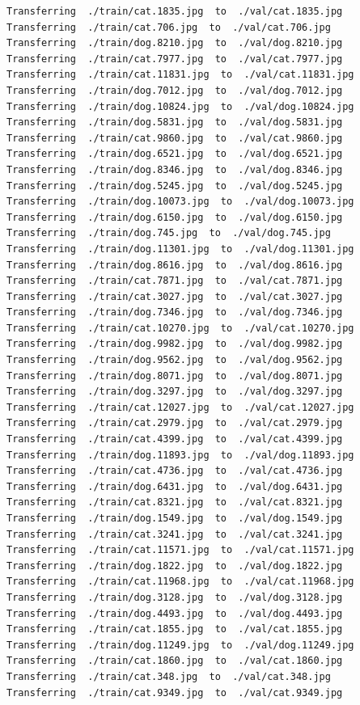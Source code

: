\documentclass[]{book}
\theoremstyle{definition}
\theoremstyle{definition}
\theoremstyle{definition}
\theoremstyle{remark}
\begin{document}
\begin{verbatim}
Transferring  ./train/cat.1835.jpg  to  ./val/cat.1835.jpg
Transferring  ./train/cat.706.jpg  to  ./val/cat.706.jpg
Transferring  ./train/dog.8210.jpg  to  ./val/dog.8210.jpg
Transferring  ./train/cat.7977.jpg  to  ./val/cat.7977.jpg
Transferring  ./train/cat.11831.jpg  to  ./val/cat.11831.jpg
Transferring  ./train/dog.7012.jpg  to  ./val/dog.7012.jpg
Transferring  ./train/dog.10824.jpg  to  ./val/dog.10824.jpg
Transferring  ./train/dog.5831.jpg  to  ./val/dog.5831.jpg
Transferring  ./train/cat.9860.jpg  to  ./val/cat.9860.jpg
Transferring  ./train/dog.6521.jpg  to  ./val/dog.6521.jpg
Transferring  ./train/dog.8346.jpg  to  ./val/dog.8346.jpg
Transferring  ./train/dog.5245.jpg  to  ./val/dog.5245.jpg
Transferring  ./train/dog.10073.jpg  to  ./val/dog.10073.jpg
Transferring  ./train/dog.6150.jpg  to  ./val/dog.6150.jpg
Transferring  ./train/dog.745.jpg  to  ./val/dog.745.jpg
Transferring  ./train/dog.11301.jpg  to  ./val/dog.11301.jpg
Transferring  ./train/dog.8616.jpg  to  ./val/dog.8616.jpg
Transferring  ./train/cat.7871.jpg  to  ./val/cat.7871.jpg
Transferring  ./train/cat.3027.jpg  to  ./val/cat.3027.jpg
Transferring  ./train/dog.7346.jpg  to  ./val/dog.7346.jpg
Transferring  ./train/cat.10270.jpg  to  ./val/cat.10270.jpg
Transferring  ./train/dog.9982.jpg  to  ./val/dog.9982.jpg
Transferring  ./train/dog.9562.jpg  to  ./val/dog.9562.jpg
Transferring  ./train/dog.8071.jpg  to  ./val/dog.8071.jpg
Transferring  ./train/dog.3297.jpg  to  ./val/dog.3297.jpg
Transferring  ./train/cat.12027.jpg  to  ./val/cat.12027.jpg
Transferring  ./train/cat.2979.jpg  to  ./val/cat.2979.jpg
Transferring  ./train/cat.4399.jpg  to  ./val/cat.4399.jpg
Transferring  ./train/dog.11893.jpg  to  ./val/dog.11893.jpg
Transferring  ./train/cat.4736.jpg  to  ./val/cat.4736.jpg
Transferring  ./train/dog.6431.jpg  to  ./val/dog.6431.jpg
Transferring  ./train/cat.8321.jpg  to  ./val/cat.8321.jpg
Transferring  ./train/dog.1549.jpg  to  ./val/dog.1549.jpg
Transferring  ./train/cat.3241.jpg  to  ./val/cat.3241.jpg
Transferring  ./train/cat.11571.jpg  to  ./val/cat.11571.jpg
Transferring  ./train/dog.1822.jpg  to  ./val/dog.1822.jpg
Transferring  ./train/cat.11968.jpg  to  ./val/cat.11968.jpg
Transferring  ./train/dog.3128.jpg  to  ./val/dog.3128.jpg
Transferring  ./train/dog.4493.jpg  to  ./val/dog.4493.jpg
Transferring  ./train/cat.1855.jpg  to  ./val/cat.1855.jpg
Transferring  ./train/dog.11249.jpg  to  ./val/dog.11249.jpg
Transferring  ./train/cat.1860.jpg  to  ./val/cat.1860.jpg
Transferring  ./train/cat.348.jpg  to  ./val/cat.348.jpg
Transferring  ./train/cat.9349.jpg  to  ./val/cat.9349.jpg

\end{verbatim}
\end{document}
